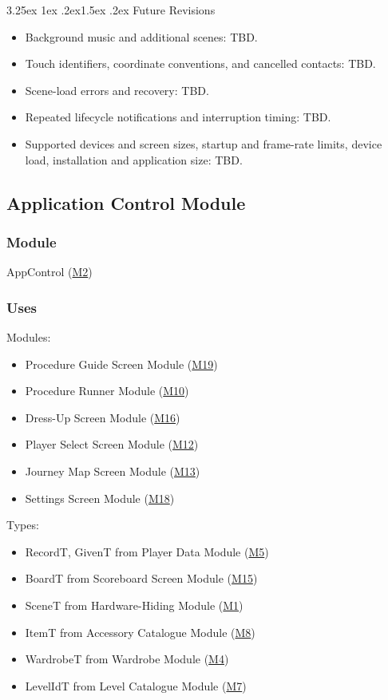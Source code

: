 \documentclass[10pt, titlepage]{article}
\makeatletter
\newcommand{\misref}[2]{\hyperref[mis:#1]{M#2}}
\renewcommand\paragraph{\@startsection{paragraph}{4}{\z@}%
  {3.25ex \@plus 1ex \@minus .2ex}{1.5ex \@plus .2ex}%
  {\normalfont\normalsize\bfseries}}
\makeatother
\begin{document}
\paragraph{Future Revisions}

\begin{itemize}
\item Background music and additional scenes: TBD.
\item Touch identifiers, coordinate conventions, and cancelled contacts: TBD.
\item Scene-load errors and recovery: TBD.
\item Repeated lifecycle notifications and interruption timing: TBD.
\item Supported devices and screen sizes, startup and frame-rate limits,
  device load, installation and application size: TBD.
\end{itemize}

\newpage
\subsection{Application Control Module} \label{mis:Control}

\subsubsection{Module}

AppControl (\misref{Control}{2})

\subsubsection{Uses}

Modules:
\begin{itemize}
\item Procedure Guide Screen Module (\misref{Guide}{19})
\item Procedure Runner Module (\misref{Runner}{10})
\item Dress-Up Screen Module (\misref{DressUp}{16})
\item Player Select Screen Module (\misref{PlayerSelect}{12})
\item Journey Map Screen Module (\misref{Map}{13})
\item Settings Screen Module (\misref{Settings}{18})
\end{itemize}

Types:
\begin{itemize}
\item RecordT, GivenT from Player Data Module (\misref{PlayerData}{5})
\item BoardT from Scoreboard Screen Module (\misref{Scoreboard}{15})
\item SceneT from Hardware-Hiding Module (\misref{HH}{1})
\item ItemT from Accessory Catalogue Module (\misref{Accessories}{8})
\item WardrobeT from Wardrobe Module (\misref{Wardrobe}{4})
\item LevelIdT from Level Catalogue Module (\misref{Levels}{7})
\end{itemize}
\end{document}
